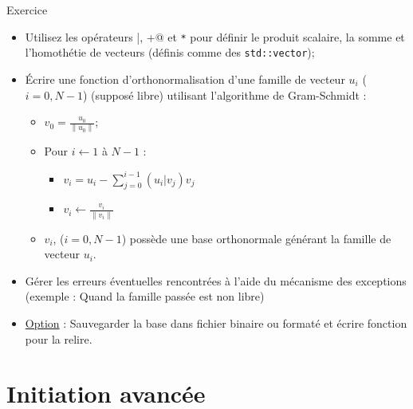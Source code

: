 \documentclass[compress,10pt,aspectratio=169]{beamer}
\begin{document}
\begin{frame}[fragile]{Exercice}
    \scriptsize
    
    \begin{itemize}
    \item Utilisez les opérateurs \verb@|, +@ et \verb|*| pour définir le produit scalaire, la somme et l'homothétie de vecteurs 
  (définis comme des \texttt{std::vector});
    \item \'Ecrire une fonction d'orthonormalisation d'une famille de vecteur $u_{i}$ ($i=0,N-1$) (supposé libre) utilisant l'algorithme de Gram-Schmidt :
    \begin{itemize}
    \small
    \item $v_{0} = \frac{u_{0}}{\|u_{0}\|}$;
    \item Pour $i \leftarrow 1$ à $N-1$ :
    \begin{itemize}
    \small
    \item $\displaystyle v_{i} = u_{i} - \sum_{j=0}^{i-1} (u_{i}|v_{j})v_{j}$
    \item $v_{i} \leftarrow \frac{v_{i}}{\|v_{i}\|}$
    \end{itemize}
    \item $v_{i}$, ($i=0,N-1$) possède une base orthonormale générant la famille de vecteur $u_{i}$.
    \end{itemize}
    \item Gérer les erreurs éventuelles rencontrées à l'aide du mécanisme des exceptions (exemple : Quand la famille passée est non libre)
    \item \underline{Option} : Sauvegarder la base dans  fichier binaire ou formaté et écrire fonction pour la relire.
    \end{itemize}
\end{frame}

\section{Initiation avancée}
\end{document}

